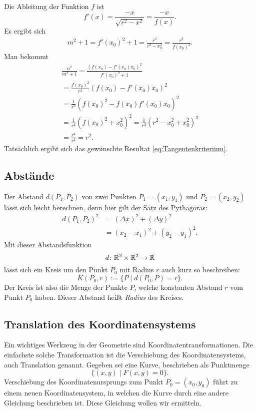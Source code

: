 Die Ableitung der Funktion $f$ ist%
\begin{equation}
f'(x) = \frac{-x}{\sqrt{r^2-x^2}} = \frac{-x}{f(x)}.
\end{equation}
Es ergibt sich
\begin{gather}
m^2+1 = f'(x_0)^2+1 = \frac{r^2}{r^2-x_0^2} = \frac{r^2}{f(x_0)^2}.
\end{gather}
Man bekommt
\begin{gather*}
\frac{n^2}{m^2+1}
= \frac{(f(x_0)-f'(x_0)x_0)^2}{f'(x_0)^2+1}\\
= \frac{f(x_0)^2}{r^2}(f(x_0)-f'(x_0)x_0)^2\\
= \frac{1}{r^2}(f(x_0)^2-f(x_0)f'(x_0)x_0)^2\\
= \frac{1}{r^2}(f(x_0)^2+x_0^2)^2
= \frac{1}{r^2}(r^2-x_0^2+x_0^2)^2\\
= \frac{r^4}{r^2} = r^2.
\end{gather*}
Tatsächlich ergibt sich das gewünschte Resultat
\eqref{eq:Tangentenkriterium}.

\subsection{Abstände}

Der Abstand $d(P_1,P_2)$ von zwei Punkten
$P_1=(x_1,y_1)$ und $P_2=(x_2,y_2)$ lässt sich leicht berechnen,
denn hier gilt der Satz des Pythagoras:%
\begin{equation}
\begin{split}
d(P_1,P_2)^2 &= (\Delta x)^2+(\Delta y)^2\\
&= (x_2-x_1)^2+(y_2-y_1)^2.
\end{split}
\end{equation}
Mit dieser Abstandsfunktion
\[d\colon \mathbb R^2\times\mathbb R^2\to\mathbb R\]
lässt sich ein Kreis um den Punkt $P_0$ mit Radius $r$
auch kurz so beschreiben:%
\begin{equation}
K(P_0,r) := \{P\mid d(P_0,P)=r\}.
\end{equation}
Der Kreis ist also die Menge der Punkte $P$, welche konstanten
Abstand $r$ vom Punkt $P_0$ haben. Dieser Abstand heißt \emph{Radius}
des Kreises.

\subsection{Translation des Koordinatensystems}

Ein wichtiges Werkzeug in der Geometrie sind
Koordinatentransformationen. Die einfachste solche Transformation
ist die Verschiebung des Koordinatensystems, auch Translation
genannt.
Gegeben sei eine Kurve, beschrieben als Punktmenge%
\begin{equation}
\{(x,y)\mid F(x,y)=0\}.
\end{equation}
Verschiebung des Koordinatenursprungs zum Punkt $P_0=(x_0,y_0)$
führt zu einem neuen Koordinatensystem, in welchen die Kurve durch
eine andere Gleichung beschrieben ist. Diese Gleichung wollen wir
ermitteln.

